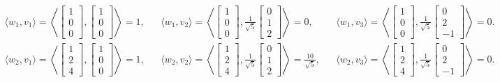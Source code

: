 \documentclass[11pt,letterpaper]{article}
\begin{document}
\begin{align*}
    \langle w_1,v_1\rangle=\left\langle \begin{bmatrix} 1\\0\\0 \end{bmatrix},\begin{bmatrix} 1\\0\\0 \end{bmatrix} \right\rangle=1, 
    &&\langle w_1,v_2\rangle=\left\langle \begin{bmatrix} 1\\0\\0 \end{bmatrix},\frac{1}{\sqrt{5}}\begin{bmatrix} 0\\1\\2 \end{bmatrix} \right\rangle =0,
    &&\langle w_1,v_3\rangle=\left\langle \begin{bmatrix} 1\\0\\0 \end{bmatrix},\frac{1}{\sqrt{5}}\begin{bmatrix} 0\\2\\-1 \end{bmatrix} \right\rangle = 0. \\
    \langle w_2,v_1\rangle=\left\langle \begin{bmatrix} 1\\2\\4 \end{bmatrix},\begin{bmatrix} 1\\0\\0 \end{bmatrix} \right\rangle=1, 
    &&\langle w_2,v_2\rangle=\left\langle \begin{bmatrix} 1\\2\\4 \end{bmatrix},\frac{1}{\sqrt{5}}\begin{bmatrix} 0\\1\\2 \end{bmatrix} \right\rangle =\frac{10}{\sqrt{5}},
    &&\langle w_2,v_3\rangle=\left\langle \begin{bmatrix} 1\\2\\4 \end{bmatrix},\frac{1}{\sqrt{5}}\begin{bmatrix} 0\\2\\-1 \end{bmatrix} \right\rangle =0.\\

\end{align*}
\end{document}
